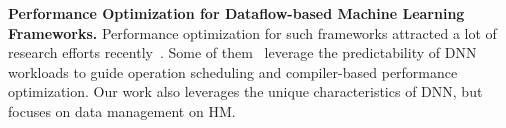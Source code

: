 \textbf{Performance Optimization for Dataflow-based Machine Learning Frameworks.}
Performance optimization for such frameworks attracted a lot of research efforts recently~\cite{222575,pmlr-v80-gao18a,222629,liu:micro18,ipdps19_liu,234946,google:device_placement,google:device_placement_re,222605,DBLP:conf/asplos/SivathanuCSZ19,DBLP:journals/corr/abs-1802-04730,Wang:2018:SDG:3178487.3178491,222611}. 
Some of them~\cite{7472805,Jin:2018:LMR:3274266.3243904,liu:micro18, ipdps19_liu, DBLP:conf/asplos/SivathanuCSZ19,222611} leverage the predictability of DNN workloads to guide operation scheduling and compiler-based performance optimization. Our work also leverages the unique characteristics of DNN, but focuses on data management on HM. 


